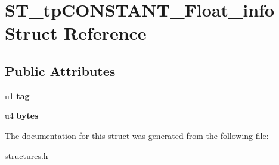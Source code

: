 \hypertarget{structST__tpCONSTANT__Float__info}{}\section{S\+T\+\_\+tp\+C\+O\+N\+S\+T\+A\+N\+T\+\_\+\+Float\+\_\+info Struct Reference}
\label{structST__tpCONSTANT__Float__info}
\subsection*{Public Attributes}
\begin{DoxyCompactItemize}
\item 
\mbox{\label{structST__tpCONSTANT__Float__info_aa8d4f6144f16c067fc1526d7874d02ce}} 
\mbox{\hyperlink{structures_8h_ad9f4cdb6757615aae2fad89dab3c5470}{u1}} {\bfseries tag}
\item 
\mbox{\label{structST__tpCONSTANT__Float__info_a18c03b5df8fb84b80d89980526181c24}} 
u4 {\bfseries bytes}
\end{DoxyCompactItemize}


The documentation for this struct was generated from the following file\+:\begin{DoxyCompactItemize}
\item 
\mbox{\hyperlink{structures_8h}{structures.\+h}}\end{DoxyCompactItemize}
